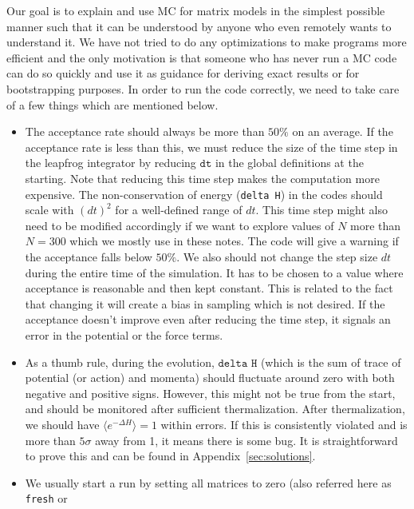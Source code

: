 \documentclass[letter,11pt]{article}
\begin{document}
Our goal is to explain and use MC for matrix models in the simplest possible manner such that it can be understood by anyone who even remotely wants to understand it. 
We have not tried to do any optimizations to make programs more efficient and the only motivation is that someone who has never run a MC code can do so quickly 
and use it as guidance for deriving exact results or for bootstrapping purposes. In order to run the code correctly, we need to take care of a few things which are 
mentioned below.  
\begin{itemize} 
\item The acceptance rate should always be more than $50\%$
on an average. If the acceptance rate is less than this, we
must reduce the size of the time step in the leapfrog integrator by reducing 
$\texttt{dt}$ in the global definitions at the starting. Note that 
reducing this time step makes the computation more expensive. 
The non-conservation of energy (\texttt{delta H}) in the codes should scale with $(dt)^2$ for a well-defined range of $dt$. 
This time step might also need to be modified 
accordingly if we want to explore values of $N$ more than $N = 300$ which we mostly use in these notes. 
The code will give a warning if the acceptance falls below $50\%$. We also should 
not change the step size $dt$ during the entire time of the simulation. It has to be 
chosen to a value where acceptance is reasonable and then kept constant. This is related to the fact that 
changing it will create a bias in sampling which is not desired. If the acceptance
doesn't improve even after reducing the time step, it signals an error in the potential or the force terms. 
\item As a thumb rule, during the evolution, $\texttt{delta H}$ (which is the sum of
trace of potential (or action) and momenta) should fluctuate around zero
with both negative and positive signs. However, this might not be true from the start, and should
be monitored after sufficient thermalization. After thermalization, we should have 
$\langle e^{-\Delta H} \rangle = 1$ within errors. If this is consistently violated and is more than $5\sigma$ away from 1, it means there is some bug. It is straightforward to prove this and can be found in Appendix~\ref{sec:solutions}.
\item We usually start a run by setting all matrices to zero (also referred here as \texttt{fresh} or 

\end{itemize}
\end{document}
